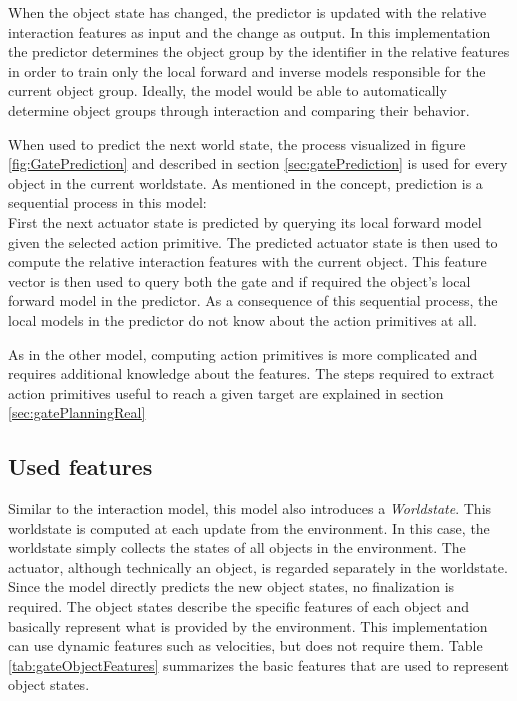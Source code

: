 When the object state has changed, the predictor is updated with the relative interaction features as input and the change as output. In this implementation the predictor determines the object group by the identifier in the relative features in order to train only the local forward and inverse models responsible for the current object group. Ideally, the model would be able to automatically determine object groups through interaction and comparing their behavior.

When used to predict the next world state, the process visualized in figure \ref{fig:GatePrediction} and described in section \ref{sec:gatePrediction} is used for every object in the current worldstate. As mentioned in the concept, prediction is a sequential process in this model: \\
First the next actuator state is predicted by querying its local forward model given the selected action primitive. The predicted actuator state is then used to compute the relative interaction features with the current object. This feature vector is then used to query both the gate and if required the object's local forward model in the predictor. 
As a consequence of this sequential process, the local models in the predictor do not know about the action primitives at all. %

As in the other model, computing action primitives is more complicated and requires additional knowledge about the features. The steps required to extract action primitives useful to reach a given target are explained in section \ref{sec:gatePlanningReal}

\subsection{Used features \label{sec:gateFeatures}}

Similar to the interaction model, this model also introduces a \textit{Worldstate}. This worldstate is computed at each update from the environment. In this case, the worldstate simply collects the states of all objects in the environment. The actuator, although technically an object, is regarded separately in the worldstate. Since the model directly predicts the new object states, no finalization is required. 
The object states describe the specific features of each object and basically represent what is provided by the environment. This implementation can use dynamic features such as velocities, but does not require them. Table \ref{tab:gateObjectFeatures} summarizes the basic features that are used to represent object states.

